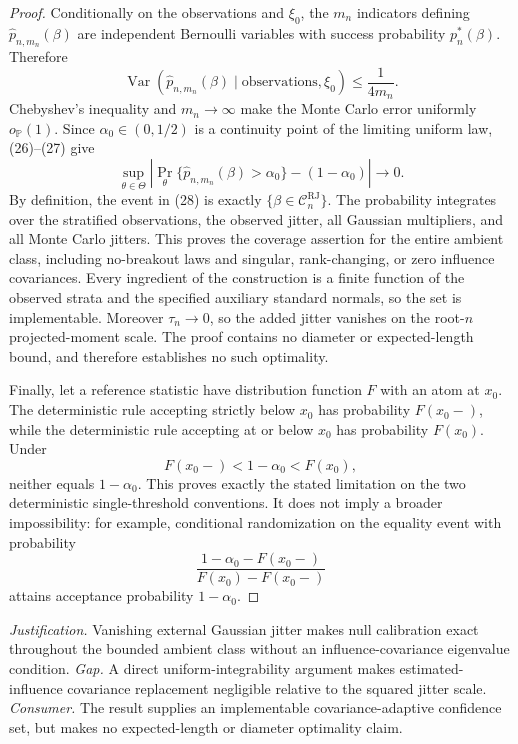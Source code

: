 \documentclass{article}
\begin{document}
\begin{proof}
Conditionally on the observations and \(\xi_0\), the \(m_n\) indicators defining
\(\widehat p_{n,m_n}(\beta)\) are independent Bernoulli variables with success probability \(p_n^*(\beta)\).  Therefore
\[
 \operatorname{Var}\!\left(
 \widehat p_{n,m_n}(\beta)\mid\text{observations},\xi_0
 \right)\leq\frac1{4m_n}. \tag{27}
\]
Chebyshev's inequality and \(m_n\to\infty\) make the Monte Carlo error uniformly \(o_{\mathbb P}(1)\).  Since \(\alpha_0\in(0,1/2)\) is a continuity point of the limiting uniform law, (26)--(27) give
\[
 \sup_{\theta\in\Theta}
 \left|\Pr_\theta\{\widehat p_{n,m_n}(\beta)>\alpha_0\}
 -(1-\alpha_0)\right|\longrightarrow0. \tag{28}
\]
By definition, the event in (28) is exactly
\(\{\beta\in\mathcal C_n^{\mathrm{RJ}}\}\).  The probability integrates over the stratified observations, the observed jitter, all Gaussian multipliers, and all Monte Carlo jitters.  This proves the coverage assertion for the entire ambient class, including no-breakout laws and singular, rank-changing, or zero influence covariances.  Every ingredient of the construction is a finite function of the observed strata and the specified auxiliary standard normals, so the set is implementable.  Moreover \(\tau_n\to0\), so the added jitter vanishes on the root-\(n\) projected-moment scale.  The proof contains no diameter or expected-length bound, and therefore establishes no such optimality.

Finally, let a reference statistic have distribution function \(F\) with an atom at \(x_0\).  The deterministic rule accepting strictly below \(x_0\) has probability \(F(x_0-)\), while the deterministic rule accepting at or below \(x_0\) has probability \(F(x_0)\).  Under
\[
 F(x_0-)<1-\alpha_0<F(x_0),
\]
neither equals \(1-\alpha_0\).  This proves exactly the stated limitation on the two deterministic single-threshold conventions.  It does not imply a broader impossibility: for example, conditional randomization on the equality event with probability
\[
 \frac{1-\alpha_0-F(x_0-)}{F(x_0)-F(x_0-)}
\]
attains acceptance probability \(1-\alpha_0\).
\end{proof}
\par\smallskip\noindent \textit{Justification.} Vanishing external Gaussian jitter makes null calibration exact throughout the bounded ambient class without an influence-covariance eigenvalue condition. \textit{Gap.} A direct uniform-integrability argument makes estimated-influence covariance replacement negligible relative to the squared jitter scale. \textit{Consumer.} The result supplies an implementable covariance-adaptive confidence set, but makes no expected-length or diameter optimality claim.
\end{document}

